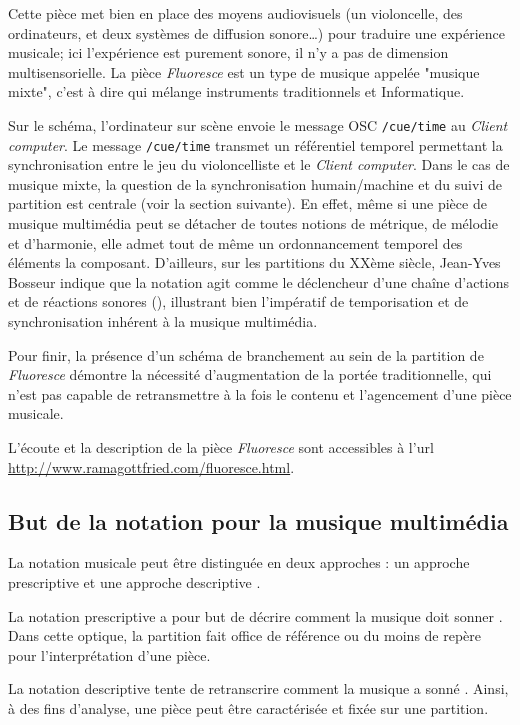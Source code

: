 Cette pièce met bien en place des moyens audiovisuels (un violoncelle, des ordinateurs, et deux systèmes de diffusion sonore…) pour traduire une expérience musicale; ici l'expérience est purement sonore, il n'y a pas de dimension multisensorielle. La pièce \textit{Fluoresce} est un type de musique appelée "musique mixte", c'est à dire qui mélange instruments traditionnels et Informatique.

Sur le schéma, l'ordinateur sur scène envoie le message OSC \texttt{/cue/time} au \textit{Client computer}. Le message \texttt{/cue/time} transmet un référentiel temporel permettant la synchronisation entre le jeu du violoncelliste et le \textit{Client computer}. 
Dans le cas de musique mixte, la question de la synchronisation humain/machine et du suivi de partition est centrale (voir la section suivante). 
En effet, même si une pièce de musique multimédia peut se détacher de toutes notions de métrique, de mélodie et d'harmonie, elle admet tout de même un ordonnancement temporel des éléments la composant.
D'ailleurs, sur les partitions du XXème siècle, Jean-Yves Bosseur indique que la notation agit comme le \og déclencheur d'une chaîne d'actions et de réactions sonores \fg (\cite[121]{bosseur2005}), illustrant bien l'impératif de temporisation et de synchronisation inhérent à la musique multimédia.

Pour finir, la présence d'un schéma de branchement au sein de la partition de \textit{Fluoresce} démontre la nécessité d'augmentation de la portée traditionnelle, qui n'est pas capable de retransmettre à la fois le contenu et l'agencement d'une pièce musicale.  

L'écoute et la description de la pièce \textit{Fluoresce} sont accessibles à l'url \url{http://www.ramagottfried.com/fluoresce.html}.

\subsection{But de la notation pour la musique multimédia}
\label{subsec:fonctionDeLaNotation}
La notation musicale peut être distinguée en deux approches : un approche prescriptive et une approche descriptive \cite{battier2015}.

La notation prescriptive a pour but de décrire \og comment la musique doit sonner \fg.
Dans cette optique, la partition fait office de référence ou du moins de repère pour l'interprétation d'une pièce. 

La notation descriptive tente de retranscrire \og comment la musique a sonné \fg.
Ainsi, à des fins d'analyse, une pièce peut être caractérisée et fixée sur une partition.

